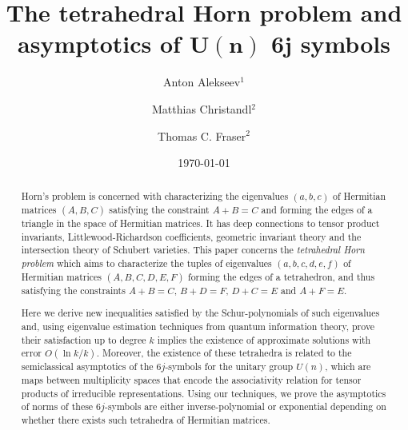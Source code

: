 \documentclass[notitlepage, 11pt, letterpaper]{amsart}
\theoremstyle{plain}
\theoremstyle{definition}
\newcommand{\ea}{a}
\newcommand{\eb}{b}
\newcommand{\ec}{c}
\newcommand{\ed}{d}
\newcommand{\ee}{e}
\newcommand{\ef}{f}
\begin{document}
\title[Tetrahedral Horn \& U(N) 6j asymptotics]%
{The tetrahedral Horn problem and \\ asymptotics of \texorpdfstring{$\boldsymbol{U(n)}$ $\boldsymbol{6j}$}{U(n) 6j} symbols}

\author{Anton Alekseev\texorpdfstring{$^1$}{}}
\author{Matthias Christandl\texorpdfstring{$^2$}{}}
\author{Thomas C. Fraser\texorpdfstring{$^2$}{}}

\address{\texorpdfstring{$^1$}{}Department of Mathematics, University of Geneva, 7-9 rue du Conseil Général, 1211 Geneva 4, Switzerland}
\address{\texorpdfstring{$^2$}{}Department of Mathematical Sciences, University of Copenhagen, Universitetsparken 5, 2100 Denmark}

\date{\today}


\begin{abstract}
    Horn's problem is concerned with characterizing the eigenvalues $(\ea,\eb,\ec)$ of Hermitian matrices $(A,B,C)$ satisfying the constraint $A+B=C$ and forming the edges of a triangle in the space of Hermitian matrices.
    It has deep connections to tensor product invariants, Littlewood-Richardson coefficients, geometric invariant theory and the intersection theory of Schubert varieties.
    This paper concerns the \textit{tetrahedral Horn problem} which aims to characterize the tuples of eigenvalues $(\ea,\eb,\ec,\ed,\ee,\ef)$ of Hermitian matrices $(A,B,C,D,E,F)$ forming the edges of a tetrahedron, and thus satisfying the constraints $A+B=C$, $B+D=F$, $D+C=E$ and $A+F=E$.

    Here we derive new inequalities satisfied by the Schur-polynomials of such eigenvalues and, using eigenvalue estimation techniques from quantum information theory, prove their satisfaction up to degree $k$ implies the existence of approximate solutions with error $O(\ln k / k)$.
    Moreover, the existence of these tetrahedra is related to the semiclassical asymptotics of the $6j$-symbols for the unitary group $U(n)$, which are maps between multiplicity spaces that encode the associativity relation for tensor products of irreducible representations.
    Using our techniques, we prove the asymptotics of norms of these $6j$-symbols are either inverse-polynomial or exponential depending on whether there exists such tetrahedra of Hermitian matrices.
\end{abstract}

\maketitle
\tableofcontents
\end{document}
